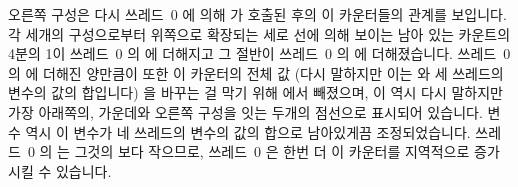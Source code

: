 \fi

오른쪽 구성은 다시 쓰레드~0 에 의해  가 호출된 후의 이
카운터들의 관계를 보입니다.
각 세개의 구성으로부터 위쪽으로 확장되는 세로 선에 의해 보이는 남아 있는
카운트의 4분의 1이 쓰레드~0 의  에 더해지고 그 절반이 쓰레드~0
의  에 더해졌습니다.
쓰레드~0 의  에 더해진 양만큼이 또한 이 카운터의 전체 값 (다시
말하지만 이는  와 세 쓰레드의  변수의 값의
합입니다) 을 바꾸는 걸 막기 위해  에서 빼졌으며, 이 역시 다시
말하지만 가장 아래쪽의, 가운데와 오른쪽 구성을 잇는 두개의 점선으로 표시되어
있습니다.
 변수 역시 이 변수가 네 쓰레드의  변수의 값의
합으로 남아있게끔 조정되었습니다.
쓰레드~0 의  는 그것의  보다 작으므로, 쓰레드~0 은
한번 더 이 카운터를 지역적으로 증가시킬 수 있습니다.

